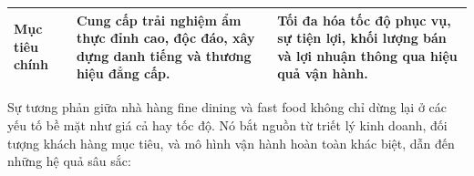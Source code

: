 \begin{longtable}{| m{3.5cm} | >{\RaggedRight}m{6.5cm} | >{\RaggedRight}m{6.5cm} |}
	\hline
	\textbf{Mục tiêu chính}              & Cung cấp trải nghiệm ẩm thực đỉnh cao, độc đáo, xây dựng danh tiếng và thương hiệu đẳng cấp.                                                                                                                                                                                            & Tối đa hóa tốc độ phục vụ, sự tiện lợi, khối lượng bán và lợi nhuận thông qua hiệu quả vận hành.                                                                                                                                                                                \\
	\hline
\end{longtable}


Sự tương phản giữa nhà hàng fine dining và fast food không chỉ dừng lại ở các yếu tố bề mặt như giá cả hay tốc độ. Nó bắt nguồn từ triết lý kinh doanh, đối tượng khách hàng mục tiêu, và mô hình vận hành hoàn toàn khác biệt, dẫn đến những hệ quả sâu sắc:

